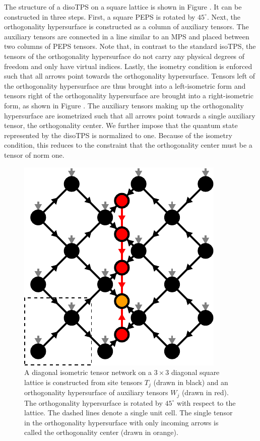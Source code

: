 The structure of a disoTPS on a square lattice is shown in Figure . It can be constructed in three steps. First, a square PEPS is rotated by $45^\circ$. Next, the orthogonality hypersurface is constructed as a column of auxiliary tensors. The auxiliary tensors are connected in a line similar to an MPS and placed between two columns of PEPS tensors. Note that, in contrast to the standard isoTPS, the tensors of the orthogonality hypersurface do not carry any physical degrees of freedom and only have virtual indices. Lastly, the isometry condition is enforced such that all arrows point towards the orthogonality hypersurface. Tensors left of the orthogonality hypersurface are thus brought into a left-isometric form and tensors right of the orthogonality hypersurface are brought into a right-isometric form, as shown in Figure . The auxiliary tensors making up the orthogonality hypersurface are isometrized such that all arrows point towards a single auxiliary tensor, the orthogonality center. We further impose that the quantum state represented by the disoTPS is normalized to one. Because of the isometry condition, this reduces to the constraint that the orthogonality center must be a tensor of norm one.\par
\begin{figure}[h]
	\centering
	\includegraphics[scale=1]{figures/tikz/disoTPS/disoTPS_structure/disoTPS_structure.pdf}
	\caption{A diagonal isometric tensor network on a $3\times3$ diagonal square lattice is constructed from site tensors $T_j$ (drawn in black) and an orthogonality hypersurface of auxiliary tensors $W_j$ (drawn in red). The orthogonality hypersurface is rotated by $45^\circ$ with respect to the lattice. The dashed lines denote a single unit cell. The single tensor in the orthogonality hypersurface with only incoming arrows is called the orthogonality center (drawn in orange).}
	\label{fig:disoTPS_structure}
\end{figure}
